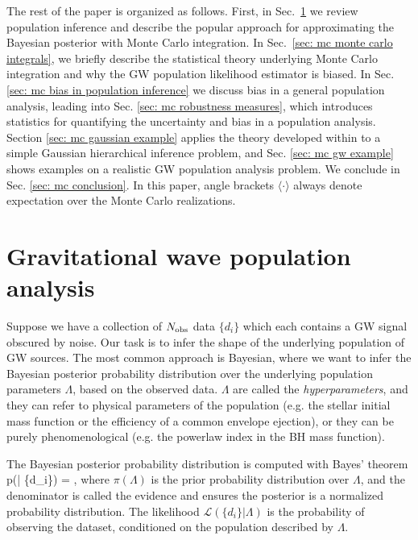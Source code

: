 The rest of the paper is organized as follows. First, in Sec.~\ref{sec: mc population analysis} we review population inference and describe the popular approach for approximating the Bayesian posterior with Monte Carlo integration. In Sec.~\ref{sec: mc monte carlo integrals}, we briefly describe the statistical theory underlying Monte Carlo integration and why the \ac{GW} population likelihood estimator is biased. In Sec. \ref{sec: mc bias in population inference} we discuss bias in a general population analysis, leading into Sec. \ref{sec: mc robustness measures}, which introduces statistics for quantifying the uncertainty and bias in a population analysis. Section \ref{sec: mc gaussian example} applies the theory developed within to a simple Gaussian hierarchical inference problem, and Sec. \ref{sec: mc gw example} shows examples on a realistic \ac{GW} population analysis problem. We conclude in Sec. \ref{sec: mc conclusion}.
In this paper, angle brackets $\langle \cdot\rangle$ always denote expectation over the Monte Carlo realizations. 

\section{Gravitational wave population analysis}
\label{sec: mc population analysis}

Suppose we have a collection of $N_{\rm obs}$ data $\{d_i\}$ which each contains a \ac{GW} signal obscured by noise. Our task is to infer the shape of the underlying population of \ac{GW} sources. The most common approach is Bayesian, where we want to infer the Bayesian posterior probability distribution over the underlying population parameters $\Lambda$, based on the observed data. $\Lambda$ are called the \textit{hyperparameters}, and they can refer to physical parameters of the population (e.g. the stellar initial mass function or the efficiency of a common envelope ejection), or they can be purely phenomenological (e.g. the powerlaw index in the \ac{BH} mass function). 

The Bayesian posterior probability distribution is computed with Bayes' theorem
\beq
p(\Lambda | \{d_i\}) = ,
\label{eq: Bayes theorem}
\eeq
where $\pi(\Lambda)$ is the prior probability distribution over $\Lambda$, and the denominator is called the evidence and ensures the posterior is a normalized probability distribution. The likelihood $\mathcal{L}(\{d_i\} | \Lambda)$ is the probability of observing the dataset, conditioned on the population described by $\Lambda$.

